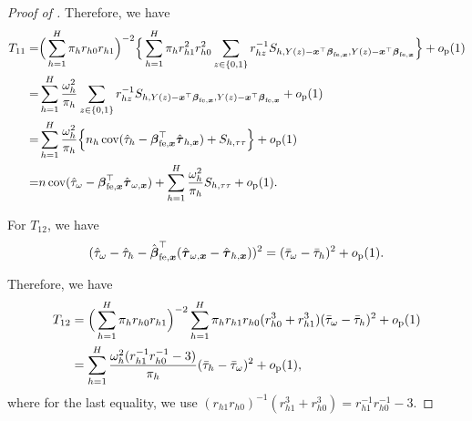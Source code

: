 \documentclass[12pt]{article}
\newcommand{\cov}{\operatorname{cov}}
\newcommand{\op}{o_{\textnormal{p}}}
\newcommand{\Op}{O_{\mathbb{P}}}
\newcommand{\fe}{\textnormal{fe}}
\newcommand{\bs}{\boldsymbol}
\begin{document}
\begin{proof}[Proof of ]
Therefore, we have
\begin{align*}
    T_{11} =& \Big(\sum_{h=1}^H \pi_{h} r_{h0} r_{h1}\Big)^{-2}  \Big\{\sum_{h=1}^H \pi_h r_{h1}^2 r_{h0}^2 \sum_{z\in\{0,1\}}r_{hz}^{-1}S_{h,Y(z)-\bs{x}^\top \bs{\beta}_{\fe, \bs{x}},Y(z)-\bs{x}^\top \bs{\beta}_{\fe, \bs{x}}}\Big\} + \op(1) \\
     =& \sum_{h=1}^H \frac{\omega_h^2}{\pi_h} \sum_{z\in\{0,1\}}r_{hz}^{-1}S_{h,Y(z)-\bs{x}^\top \bs{\beta}_{\fe, \bs{x}},Y(z)-\bs{x}^\top \bs{\beta}_{\fe, \bs{x}}} + \op(1) \\
     =& \sum_{h=1}^H \frac{\omega_h^2}{\pi_h}\Big\{n_h \cov(\hat{\tau}_{h}-\bs{\beta}_{\fe, \bs{x}}^\top \hat{\bs{\tau}}_{h,\bs{x}}) + S_{h,\tau\tau}\Big\} + \op(1)\\
     =& n\cov(\hat{\tau}_{\omega} - \bs{\beta}^\top_{\fe, \bs{x}}\hat{\bs{\tau}}_{\omega,\bs{x}}) + \sum_{h=1}^H \frac{\omega_h^2}{\pi_h} S_{h,\tau\tau} + \op(1).
\end{align*}

For $T_{12}$, we have
\begin{align*}
     (\hat{\tau}_{\omega}-\hat{\tau}_h-\hat{\bs{\beta}}_{\fe, \bs{x}}^\top(\hat{\bs{\tau}}_{\omega,\bs{x}}-\hat{\bs{\tau}}_{h,\bs{x}}))^2 
   = (\bar{\tau}_{\omega} - \bar{\tau}_{h} )^2 + \op(1).
\end{align*}



Therefore, we have
\begin{align*}
    T_{12} &= \Big(\sum_{h=1}^H \pi_{h} r_{h0} r_{h1}\Big)^{-2} \sum_{h=1}^H \pi_hr_{h1}r_{h0}(r_{h0}^3 + r_{h1}^3)  (\bar{\tau}_{\omega} - \bar{\tau}_{h} )^2 + \op(1)\\
    & =\sum_{h=1}^H \frac{\omega_h^2(r_{h1}^{-1}r_{h0}^{-1}-3)}{\pi_h}(\bar{\tau}_h-\bar{\tau}_{\omega})^2 + \op(1),
\end{align*}
where for the last equality, we use $(r_{h1}r_{h0})^{-1}(r_{h1}^3+r_{h0}^3) = r_{h1}^{-1}r_{h0}^{-1}-3$.



\end{proof}
\end{document}
